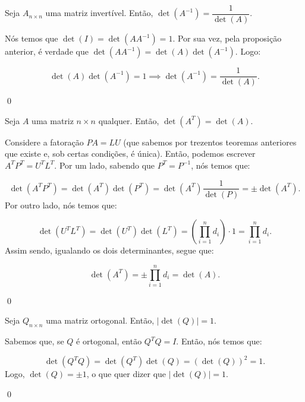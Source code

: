 \begin{Proposition}
	Seja $A_{n\times n}$ uma matriz invertível. Então, $\det(A^{-1}) = \dfrac{1}{\det(A)}$.
\end{Proposition}

\begin{Proof}
	Nós temos que $\det(I) = \det(AA^{-1}) = 1$. Por sua vez, pela proposição anterior, é verdade que $\det(AA^{-1}) = \det(A)\det(A^{-1})$. Logo:
	
	$$
	\det(A)\det(A^{-1}) = 1\implies\det(A^{-1}) = \dfrac{1}{\det(A)}.
	$$
	
	\qed
\end{Proof}

\begin{Proposition}
	Seja $A$ uma matriz $n\times n$ qualquer. Então, $\det(A^T) = \det(A)$.
\end{Proposition}

\begin{Proof}
	Considere a fatoração $PA = LU$ (que sabemos por trezentos teoremas anteriores que existe e, sob certas condições, é única). Então, podemos escrever $A^TP^T = U^TL^T$. Por um lado, sabendo que $P^T = P^{-1}$, nós temos que:
	
	$$
	\det(A^TP^T) = \det(A^T)\det(P^T) = \det(A^T)\dfrac{1}{\det(P)} = \pm\det(A^T).
	$$
	Por outro lado, nós temos que:
	
	$$
	\det(U^TL^T) = \det(U^T)\det(L^T) = \left(\prod\limits_{i = 1}^{n} d_i\right) \cdot 1 = \prod\limits_{i = 1}^{n} d_i.
	$$
	Assim sendo, igualando os dois determinantes, segue que:
	
	$$
	\det(A^T) = \pm\prod\limits_{i = 1}^{n} d_i = \det(A).
	$$
	
	\qed
\end{Proof}

\begin{Proposition}
	Seja $Q_{n\times n}$ uma matriz ortogonal. Então, $|\det(Q)| = 1$.
\end{Proposition}

\begin{Proof}
	Sabemos que, se $Q$ é ortogonal, então $Q^TQ = I$. Então, nós temos que:
	
	$$
	\det(Q^TQ) = \det(Q^T)\det(Q) = (\det(Q))^2 = 1.
	$$
	Logo, $\det(Q) = \pm 1$, o que quer dizer que $|\det(Q)| = 1$.
	
	\qed
\end{Proof}

